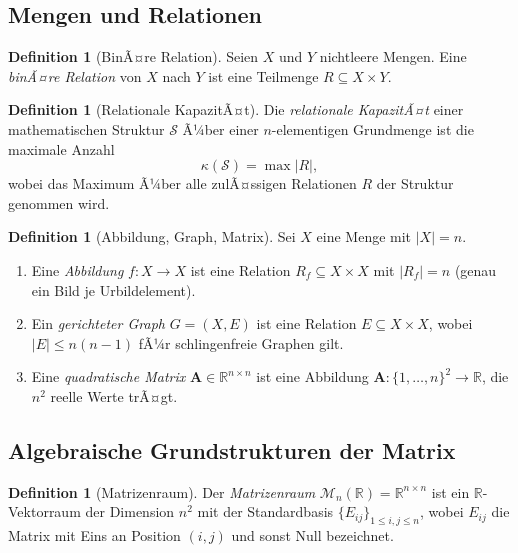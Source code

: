 ﻿\documentclass[12pt, a4paper]{article}
\theoremstyle{definition}
\newtheorem{definition}[theorem]{Definition}
\theoremstyle{remark}
\newcommand{\R}{\mathbb{R}}
\newcommand{\vA}{\bm{A}}
\begin{document}
\subsection{Mengen und Relationen}
\label{subsec:mengen}

\begin{definition}[BinÃ¤re Relation]
Seien $X$ und $Y$ nichtleere Mengen. Eine \emph{binÃ¤re Relation} von $X$
nach $Y$ ist eine Teilmenge $R \subseteq X \times Y$.
\end{definition}

\begin{definition}[Relationale KapazitÃ¤t]
\label{def:rel_kap}
Die \emph{relationale KapazitÃ¤t} einer mathematischen Struktur $\mathcal{S}$
Ã¼ber einer $n$-elementigen Grundmenge ist die maximale Anzahl
\[
  \kappa(\mathcal{S}) = \max\bigl|R\bigr|,
\]
wobei das Maximum Ã¼ber alle zulÃ¤ssigen Relationen $R$ der Struktur genommen wird.
\end{definition}

\begin{definition}[Abbildung, Graph, Matrix]
\label{def:drei}
Sei $X$ eine Menge mit $|X| = n$.
\begin{enumerate}[label=(\alph*)]
  \item Eine \emph{Abbildung} $f: X \to X$ ist eine Relation
    $R_f \subseteq X \times X$ mit $|R_f| = n$
    (genau ein Bild je Urbildelement).
  \item Ein \emph{gerichteter Graph} $G = (X, E)$ ist eine Relation
    $E \subseteq X \times X$, wobei $|E| \leq n(n-1)$ fÃ¼r schlingenfreie
    Graphen gilt.
  \item Eine \emph{quadratische Matrix} $\vA \in \R^{n \times n}$ ist eine
    Abbildung $\vA: \{1,\ldots,n\}^2 \to \R$, die $n^2$ reelle Werte
    trÃ¤gt.
\end{enumerate}
\end{definition}

\subsection{Algebraische Grundstrukturen der Matrix}
\label{subsec:algebra}

\begin{definition}[Matrizenraum]
Der \emph{Matrizenraum} $\mathcal{M}_n(\R) = \R^{n \times n}$ ist ein
$\R$-Vektorraum der Dimension $n^2$ mit der Standardbasis
$\{E_{ij}\}_{1 \leq i,j \leq n}$, wobei $E_{ij}$ die Matrix mit Eins an
Position $(i,j)$ und sonst Null bezeichnet.
\end{definition}
\end{document}
